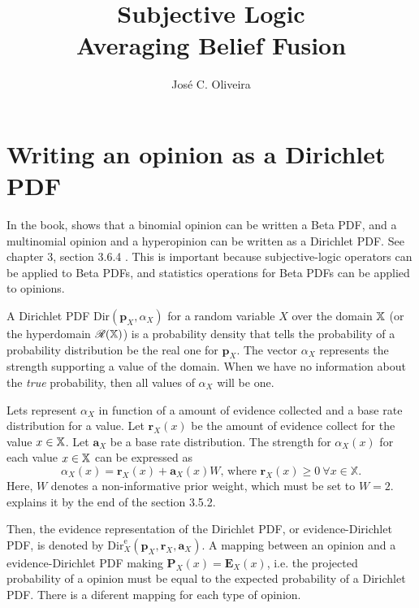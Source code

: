 \documentclass[a4paper,12pt]{article}
\title{Subjective Logic\\
\large{Averaging Belief Fusion}}
\author{José C. Oliveira}
\theoremstyle{definition}
\theoremstyle{theorem}
\numberwithin{equation}{section}
\begin{document}
\maketitle

\section{Writing an opinion as a Dirichlet PDF}

In the book, \citeauthor{josang2016subjective} shows that a binomial opinion can be written a Beta PDF, and a multinomial opinion and a hyperopinion can be written as a Dirichlet PDF. See chapter 3, section 3.6.4 \cite{josang2016subjective}. This is important because subjective-logic operators can be applied to Beta PDFs, and statistics operations for Beta PDFs can be applied to opinions.

A Dirichlet PDF $\mathrm{Dir}(\mathbf{p}_X, \alpha_X)$ for a random variable $X$ over the domain $\mathbb{X}$ (or the hyperdomain $\mathcal{R}(\mathbb{X})$) is a probability density that tells the probability of a probability distribution be the real one for $\mathbf{p}_X$. The vector $\alpha_X$ represents the strength supporting a value of the domain. When we have no information about the \emph{true} probability, then all values of $\alpha_X$ will be one.

Lets represent $\alpha_X$ in function of a amount of evidence collected and a base rate distribution for a value. Let $\mathbf{r}_X(x)$ be the amount of evidence collect for the value $x \in \mathbb{X}$. Let $\mathbf{a}_X$ be a base rate distribution. The strength for $\alpha_X(x)$ for each value $x \in \mathbb{X}$ can be expressed as
\begin{equation}\label{eq:alpha_as_evidence_and_base_rate}
    \alpha_X(x) = \mathbf{r}_X(x) + \mathbf{a}_X(x)W\text{, where }\mathbf{r}_X(x) \geq 0\ \forall x \in \mathbb{X}\text{.}
\end{equation}
Here, $W$ denotes a non-informative prior weight, which must be set to $W = 2$. \citeauthor{josang2016subjective} explains it by the end of the section 3.5.2.

Then, the evidence representation of the Dirichlet PDF, or evidence-Dirichlet PDF, is denoted by $\mathrm{Dir}^{\mathrm{e}}_X(\mathbf{p}_X, \mathbf{r}_X, \mathbf{a}_X)$. A mapping between an opinion and a evidence-Dirichlet PDF making $\mathbf{P}_X(x) = \mathbf{E}_X(x)$, i.e. the projected probability of a opinion must be equal to the expected probability of a Dirichlet PDF. There is a diferent mapping for each type of opinion.
\end{document}
